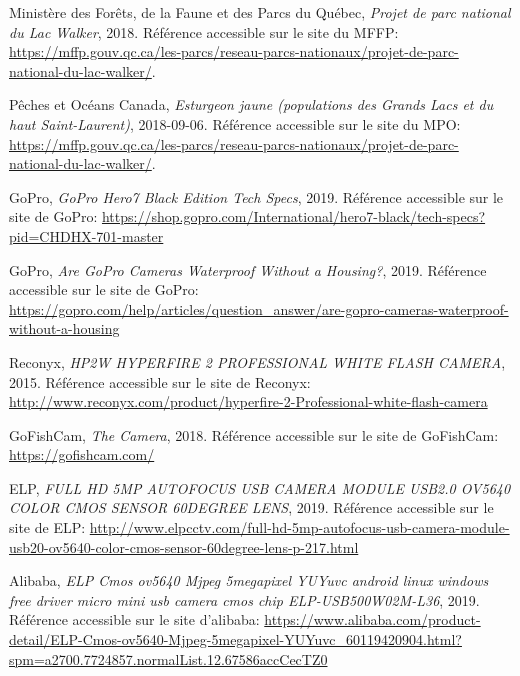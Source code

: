 
%
%

\begin{thebibliographyUL}{9} %

 Ministère des Forêts, de la Faune et des Parcs du Québec, \emph{Projet de parc national du Lac Walker}, 2018. Référence accessible sur le site du MFFP: \url{https://mffp.gouv.qc.ca/les-parcs/reseau-parcs-nationaux/projet-de-parc-national-du-lac-walker/}.

 Pêches et Océans Canada, \emph{Esturgeon jaune (populations des Grands Lacs et du haut Saint-Laurent)}, 2018-09-06. Référence accessible sur le site du MPO: \url{https://mffp.gouv.qc.ca/les-parcs/reseau-parcs-nationaux/projet-de-parc-national-du-lac-walker/}.

 GoPro, \emph{GoPro Hero7 Black Edition Tech Specs}, 2019. Référence accessible sur le site de GoPro: \url{https://shop.gopro.com/International/hero7-black/tech-specs?pid=CHDHX-701-master}

 GoPro, \emph{Are GoPro Cameras Waterproof Without a Housing?}, 2019. Référence accessible sur le site de GoPro: \url{https://gopro.com/help/articles/question_answer/are-gopro-cameras-waterproof-without-a-housing}

 Reconyx, \emph{HP2W HYPERFIRE 2 PROFESSIONAL WHITE FLASH CAMERA}, 2015. Référence accessible sur le site de Reconyx: \url{http://www.reconyx.com/product/hyperfire-2-Professional-white-flash-camera}

 GoFishCam, \emph{The Camera}, 2018. Référence accessible sur le site de GoFishCam: \url{https://gofishcam.com/}

 ELP, \emph{FULL HD 5MP AUTOFOCUS USB CAMERA MODULE USB2.0 OV5640 COLOR CMOS SENSOR 60DEGREE LENS}, 2019. Référence accessible sur le site de ELP: \url{http://www.elpcctv.com/full-hd-5mp-autofocus-usb-camera-module-usb20-ov5640-color-cmos-sensor-60degree-lens-p-217.html}

 Alibaba, \emph{ELP Cmos ov5640 Mjpeg 5megapixel YUYuvc android linux windows free driver micro mini usb camera cmos chip ELP-USB500W02M-L36}, 2019. Référence accessible sur le site d'alibaba: \url{https://www.alibaba.com/product-detail/ELP-Cmos-ov5640-Mjpeg-5megapixel-YUYuvc_60119420904.html?spm=a2700.7724857.normalList.12.67586accCecTZ0}


\end{thebibliographyUL}
